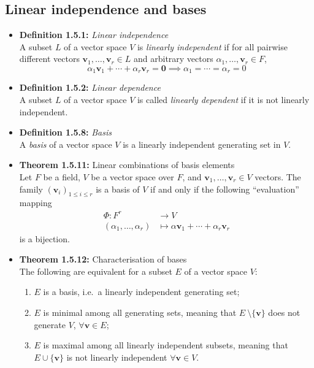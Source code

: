\documentclass[11pt,a4paper]{article}
\begin{document}
\subsection{Linear independence and bases}

\begin{itemize}

    \item \textbf{Definition 1.5.1:} \emph{Linear independence} \\
        A subset $L$ of a vector space $V$ is \emph{linearly independent}
        if for all pairwise different vectors
        $\textbf{v}_1, \ldots, \textbf{v}_r \in L$ and arbitrary vectors
        $\alpha_1, \ldots, \textbf{v}_r \in F$,
        \[
            \alpha_1 \textbf{v}_1 + \cdots + \alpha_r \textbf{v}_r = \textbf{0} \implies
            \alpha_1 = \cdots = \alpha_r = 0
        \]

    \item \textbf{Definition 1.5.2:} \emph{Linear dependence} \\
        A subset $L$ of a vector space $V$ is called \emph{linearly dependent} if it is not
        linearly independent.

    \item \textbf{Definition 1.5.8:} \emph{Basis} \\
        A \emph{basis} of a vector space $V$ is a linearly independent generating set in $V$.

    \item \textbf{Theorem 1.5.11:} Linear combinations of basis elements \\
        Let $F$ be a field, $V$ be a vector space over $F$, and
        $\textbf{v}_1, \ldots, \textbf{v}_r \in V$ vectors.
        The family ${(\textbf{v}_i)}_{1 \leq i \leq r}$ is a basis of $V$ if and only if the
        following ``evaluation'' mapping
        \begin{align*}{}
            \Phi : F^r                    & \to V \\
            (\alpha_1, \ldots, \alpha_r)  & \mapsto \alpha\textbf{v}_1 +
            \cdots + \alpha_r\textbf{v}_r
        \end{align*}
        is a bijection.

    \item \textbf{Theorem 1.5.12:} Characterisation of bases \\
        The following are equivalent for a subset $E$ of a vector space $V$:
        \begin{enumerate}
            \item $E$ is a basis, i.e.\ a linearly independent generating set;
            \item $E$ is minimal among all generating sets,
                meaning that $E \ \setminus \{\textbf{v}\}$ does not generate $V$,
                $\forall \textbf{v} \in E$;
            \item $E$ is maximal among all linearly independent subsets,
                meaning that $E \cup \{\textbf{v}\}$ is not linearly independent
                $\forall \textbf{v} \in V$.
        \end{enumerate}


\end{itemize}
\end{document}

